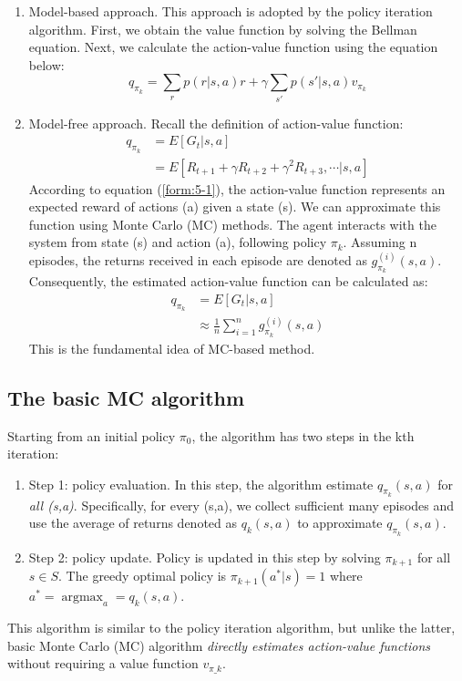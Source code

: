 \begin{enumerate}

	\item Model-based approach. This approach is adopted by the policy iteration algorithm. First, we obtain the value function by solving the Bellman
	      equation. Next, we calculate the action-value function using the equation below:
	      \begin{equation*}
		      q_{\pi_{k}}=\sum_{r}p(r|s,a)r+\gamma \sum_{s'}p(s'|s,a)v_{\pi_{k}}
	      \end{equation*}

	\item Model-free approach. Recall the definition of action-value function:
	      \begin{align*}
		      q_{\pi_{k}} & = E[G_{t}|s,a]                                           \\
		                  & = E[R_{t+1}+\gamma R_{t+2}+\gamma^{2}R_{t+3},\cdots|s,a]
	      \end{align*}
	      According to equation (\ref{form:5-1}), the action-value function represents an expected reward of actions (a) given a state (s). We can approximate this function using Monte Carlo (MC) methods. The agent interacts with the system from state (s) and action (a), following policy $\pi_{k}$. Assuming n episodes, the returns received in each episode are denoted as $g_{\pi_{k}}^{(i)}(s, a)$. Consequently, the estimated action-value function can be calculated as:
	      \begin{align*}
		      q_{\pi_{k}} & = E[G_{t}|s,a]                                          \\
		                  & \approx \frac{1}{n}\sum_{i=1}^{n}g_{\pi_{k}}^{(i)}(s,a)
	      \end{align*}
	      This is the fundamental idea of MC-based method.
\end{enumerate}

\subsection{The basic MC algorithm}
Starting from an initial policy $\pi_{0}$, the algorithm has two steps in the kth iteration:
\begin{enumerate}

	\item Step 1: policy evaluation. In this step, the algorithm estimate $q_{\pi_{k}}(s,a)$ for \emph{all (s,a)}. Specifically, for every (s,a), we
	      collect sufficient many episodes and use the average of returns denoted as $q_{k}(s,a)$ to approximate $q_{\pi_{k}}(s,a)$.
	\item Step 2: policy update. Policy is updated in this step by solving $\pi_{k+1}$ for all $s \in S$. The greedy optimal policy is
	      $\pi_{k+1}(a^{*}|s)=1$ where $a^{*}=\mathop{\arg\max}_{a}=q_{k}(s,a)$.
\end{enumerate}
This algorithm is similar to the policy iteration algorithm, but unlike the latter, basic Monte Carlo (MC) algorithm \emph{directly estimates action-value functions} without requiring a value function $v_{\pi\_k}$. \par

